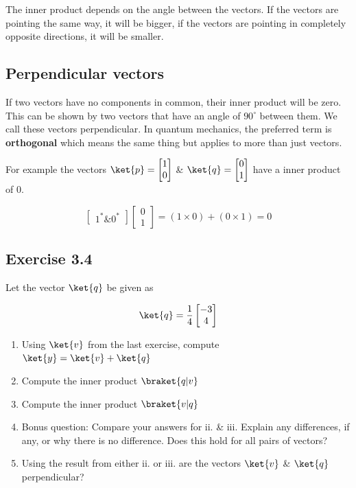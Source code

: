 \documentclass{book}
\begin{document}
The inner product depends on the angle between the vectors. If the vectors are pointing the same way, it will be bigger, if the vectors are pointing in completely opposite directions, it will be smaller. 

\subsection{ Perpendicular vectors }

If two vectors have no components in common, their inner product will be zero. This can be shown by two vectors that have an angle of $ 90^{\circ} $ between them.  We call these vectors perpendicular. In quantum mechanics, the preferred term is \textbf{orthogonal} which means the same thing but applies to more than just vectors. 

For example the vectors $\ket{p} = \begin{bmatrix} 1 \\ 0 \end{bmatrix}$ \& $\ket{q} = \begin{bmatrix} 0 \\ 1 \end{bmatrix}$ have a inner product  of 0. 

$$ \begin{bmatrix} 1^* \& 0^* \end{bmatrix}  \begin{bmatrix} 0 \\ 1 \end{bmatrix} = (1 \times 0) + (0 \times 1) = 0$$



\subsection{Exercise 3.4}

Let the vector $\ket{q}$ be given as 

$$ \ket{q} = \frac{1}{4} \begin{bmatrix} -3 \\ 4 \end{bmatrix} $$

\begin{enumerate}[i]
    \item Using $\ket{v}$ from the last exercise, compute  $\ket{y} = \ket{v} + \ket{q} $
    \item Compute the inner product $ \braket{q | v} $
    \item Compute the inner product $ \braket{v | q} $ 
    \item Bonus question: Compare your answers for ii. \& iii. Explain any differences, if any, or why there is no difference. Does this hold for all pairs of vectors?
    \item Using the result from either ii. or iii. are the vectors $\ket{v}$ \& $\ket{q}$ perpendicular?
    
\end{enumerate}
\end{document}

